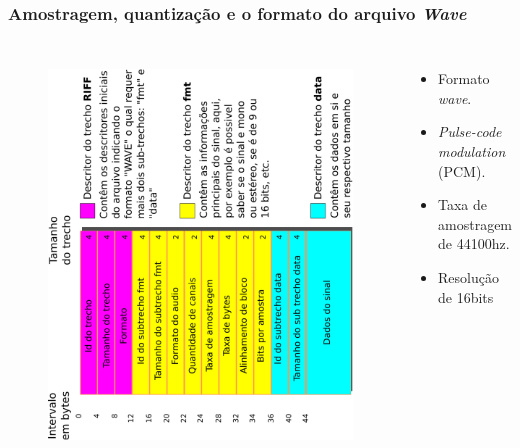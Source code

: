 \documentclass{beamer}
\begin{document}
	\begin{frame}
		\frametitle{Amostragem, quantização e o formato do arquivo \textit{Wave}}
		\begin{columns}
			\begin{figure}
				\centering
				\includegraphics[width=0.88\linewidth, angle=-90]{images/wavePcmStructure.pdf}
				\label{fig:wavePcmStructure}
			\end{figure}
			\begin{itemize}
				\item Formato \textit{wave}.
				\item \textit{Pulse-code modulation} (PCM).
				\item Taxa de amostragem de 44100hz.
				\item Resolução de 16bits
			\end{itemize}
		\end{columns}
	\end{frame}
\end{document}

